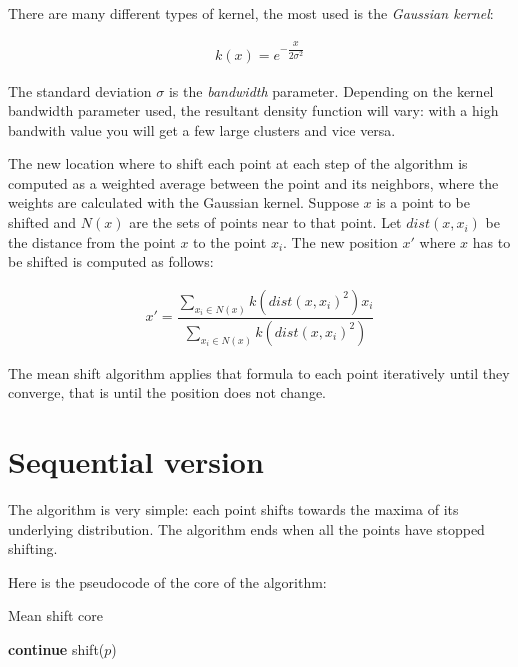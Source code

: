 \documentclass[10pt,twocolumn,letterpaper]{article}
\begin{document}
There are many different types of kernel, the most used is the \textit{Gaussian kernel}:

\begin{align}
k(x) =  e^{-\dfrac{x}{2\sigma^2}}
\end{align}

The standard deviation $\sigma$ is the \textit{bandwidth} parameter. Depending on the kernel bandwidth parameter used, the resultant density function will vary: with a high bandwith value you will get a few large clusters and vice versa.

The new location where to shift each point at each step of the algorithm is computed as a weighted average between the point and its neighbors, where the weights are calculated with the Gaussian kernel. Suppose $x$ is a point to be shifted and $N(x)$ are the sets of points near to that point. Let $dist(x, x_i)$ be the distance from the point $x$ to the point $x_i$. The new position $x'$ where $x$ has to be shifted is computed as follows:

\begin{align}
x' = \dfrac{\sum_{x_i \in N(x)} k(dist(x,x_i)^2) x_i}{\sum_{x_i \in N(x)} k(dist(x, x_i)^2)}
\end{align}

The mean shift algorithm applies that formula to each point iteratively until they converge, that is until the position does not change.

\section{Sequential version}

The algorithm is very simple: each point shifts towards the maxima of its underlying distribution. The algorithm ends when all the points have stopped shifting.

Here is the pseudocode of the core of the algorithm:

\begin{algorithm}
\label{MeanShiftAlgSeq}
\caption{Mean shift core}
\begin{algorithmic}

                    \State \textbf{continue}
                \EndIf
            \State shift($p$)
            \EndFor
    \EndWhile

\end{algorithmic}
\end{algorithm}
\end{document}
